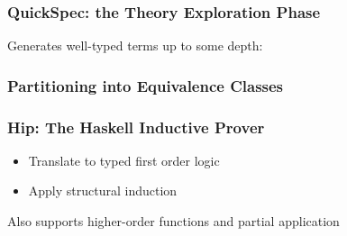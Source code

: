 \documentclass[serif,professionalfont]{beamer}
\newcommand\dn[0]{\vspace{\baselineskip}}
\begin{document}


\begin{comment} %
  Prove properties of functional programs using rewriting and
  induction.

  {\color{Purpleee} Problem:} Som properties require lemmas to be proved, that

  \begin{itemize}
    \item Needs to be conjectured,
    \item Requires induction to be proved, and
    \item Might require lemmas themselves
  \end{itemize}
\end{comment}


\begin{frame}
    \frametitle{QuickSpec: the Theory Exploration Phase}
    Generates well-typed terms up to some depth:
    \dn
    
\end{frame}

\begin{frame}[fragile]
    \frametitle{Partitioning into Equivalence Classes}

    


\end{frame}

\begin{frame}[fragile]
  \frametitle{Hip: The Haskell Inductive Prover}

  \begin{itemize}
    \item Translate to typed first order logic
    \item Apply structural induction

  \end{itemize}

  Also supports higher-order functions and partial application
\end{frame}
\end{document}
